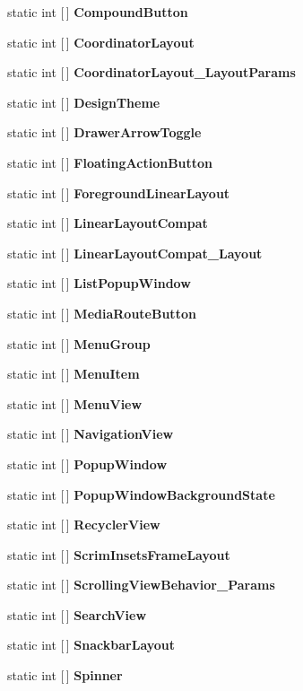 \begin{DoxyCompactItemize}
\item 
static int \mbox{[}$\,$\mbox{]} {\bfseries Compound\+Button}
\item 
static int \mbox{[}$\,$\mbox{]} {\bfseries Coordinator\+Layout}
\item 
static int \mbox{[}$\,$\mbox{]} {\bfseries Coordinator\+Layout\+\_\+\+Layout\+Params}
\item 
static int \mbox{[}$\,$\mbox{]} {\bfseries Design\+Theme}
\item 
static int \mbox{[}$\,$\mbox{]} {\bfseries Drawer\+Arrow\+Toggle}
\item 
static int \mbox{[}$\,$\mbox{]} {\bfseries Floating\+Action\+Button}
\item 
static int \mbox{[}$\,$\mbox{]} {\bfseries Foreground\+Linear\+Layout}
\item 
static int \mbox{[}$\,$\mbox{]} {\bfseries Linear\+Layout\+Compat}
\item 
static int \mbox{[}$\,$\mbox{]} {\bfseries Linear\+Layout\+Compat\+\_\+\+Layout}
\item 
static int \mbox{[}$\,$\mbox{]} {\bfseries List\+Popup\+Window}
\item 
static int \mbox{[}$\,$\mbox{]} {\bfseries Media\+Route\+Button}
\item 
static int \mbox{[}$\,$\mbox{]} {\bfseries Menu\+Group}
\item 
static int \mbox{[}$\,$\mbox{]} {\bfseries Menu\+Item}
\item 
static int \mbox{[}$\,$\mbox{]} {\bfseries Menu\+View}
\item 
static int \mbox{[}$\,$\mbox{]} {\bfseries Navigation\+View}
\item 
static int \mbox{[}$\,$\mbox{]} {\bfseries Popup\+Window}
\item 
static int \mbox{[}$\,$\mbox{]} {\bfseries Popup\+Window\+Background\+State}
\item 
static int \mbox{[}$\,$\mbox{]} {\bfseries Recycler\+View}
\item 
static int \mbox{[}$\,$\mbox{]} {\bfseries Scrim\+Insets\+Frame\+Layout}
\item 
static int \mbox{[}$\,$\mbox{]} {\bfseries Scrolling\+View\+Behavior\+\_\+\+Params}
\item 
static int \mbox{[}$\,$\mbox{]} {\bfseries Search\+View}
\item 
static int \mbox{[}$\,$\mbox{]} {\bfseries Snackbar\+Layout}
\item 
static int \mbox{[}$\,$\mbox{]} {\bfseries Spinner}
\item 

\end{DoxyCompactItemize}
